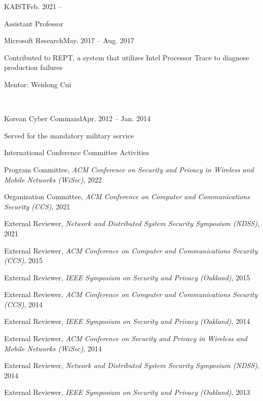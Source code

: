 \documentclass[11pt,letterpaper]{article}
\begin{document}
\begin{centry}{KAIST}{Feb. 2021 --}
\item Assistant Professor
\end{centry}
\begin{centry}{Microsoft Research}{May. 2017 -- Aug. 2017}
\item Contributed to REPT, a system that utilizes Intel Processor Trace to diagnose production failures
  \item Mentor:  Weidong Cui
\end{centry}
 \\
\begin{centry}{Korean Cyber Command}{Apr. 2012 -- Jan. 2014}
  \item Served for the mandatory military service
\end{centry}

\begin{centry}{International Conference Committee Activities}{}
  \item{Program Committee, \emph{ACM Conference on Security and Privacy in Wireless and Mobile Networks (WiSec)}, 2022}
  \item{Organization Committee, \emph{ACM Conference on Computer and Communications Security (CCS)}, 2021}
  \item{External Reviewer, \emph{Network and Distributed System Security Symposium (NDSS)}, 2021}
  \item{External Reviewer, \emph{ACM Conference on Computer and Communications Security (CCS)}, 2015}
  \item{External Reviewer, \emph{IEEE Symposium on Security and Privacy (Oakland)}, 2015}
  \item{External Reviewer, \emph{ACM Conference on Computer and Communications Security (CCS)}, 2014}
  \item{External Reviewer, \emph{IEEE Symposium on Security and Privacy (Oakland)}, 2014}
  \item{External Reviewer, \emph{ACM Conference on Security and Privacy in Wireless and Mobile Networks (WiSec)}, 2014}
  \item{External Reviewer, \emph{Network and Distributed System Security Symposium (NDSS)}, 2014}
  \item{External Reviewer, \emph{IEEE Symposium on Security and Privacy (Oakland)}, 2013}
\end{centry}
\end{document}
